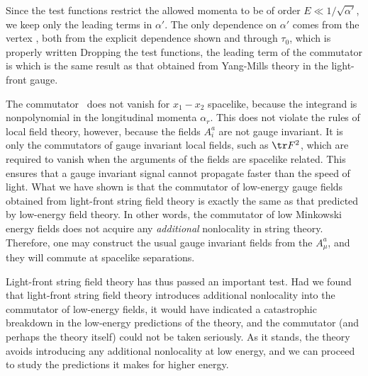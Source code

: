 Since the test functions restrict the allowed momenta to be of order
$E \ll 1/\sqrt{\alpha'}$, we keep only the leading terms in
$\alpha'$.  The only dependence on $\alpha'$ comes from the vertex
\Avert , both from the explicit dependence shown and through
$\tau_0$, which is properly written
\eqn{}
Dropping the test functions, the leading term of the commutator is
\eqn{}
which is the same result as that obtained from Yang-Mills theory in
the light-front gauge.

The commutator \Acomm\ does not vanish for $x_1-x_2$ spacelike,
because the integrand is nonpolynomial in the longitudinal momenta
$\alpha_r$.  This does not
violate the rules of local field theory, however, because the fields
$A^a_i$ are not gauge invariant.  It is only the commutators of
gauge invariant local fields, such as $\tr F^2$, which are
required to vanish when the arguments of the fields are spacelike
related.  This ensures that a gauge invariant signal cannot propagate
faster than the speed of light.  What we have shown is that the
commutator of low-energy gauge fields obtained from light-front
string field theory is exactly the same as that predicted by
low-energy field theory.  In other words, the commutator of low
Minkowski
energy fields does not acquire any {\it additional} nonlocality in
string theory.  Therefore, one may construct the usual gauge
invariant fields from the $A^a_{\mu}$, and they will commute at
spacelike separations.

Light-front string field theory has thus passed an important test.
Had we found that light-front string field theory introduces
additional nonlocality into the commutator of low-energy fields, it
would have indicated a catastrophic breakdown in the low-energy
predictions of the theory, and the commutator (and perhaps the theory
itself) could not be taken seriously.  As it stands, the theory
avoids introducing any additional nonlocality at low energy, and we
can proceed to study the predictions it makes for higher energy.

